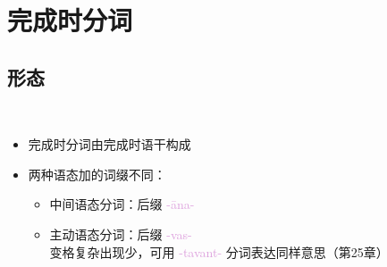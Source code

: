 \documentclass[17pt]{beamer}
\newcommand{\skt}[1]{{\sanskritfont{#1}}} %
\newcommand{\pratyaya}[1]{\mbox{\textcolor{Plum}{#1}}}
\begin{document}

\section[完成时\\分词]{完成时分词}
\begin{frame}{\insertsection}
  \small
  \tableofcontents[currentsection]
\end{frame}

\subsection{形态}
\begin{frame}{\insertsection ~~\insertsubsection}
  \begin{itemize}
    \item 完成时分词由完成时语干构成
    \item 两种语态加的词缀不同：
    \begin{itemize}
      \item 中间语态分词：后缀 \pratyaya{-āna-}
      \item 主动语态分词：后缀 \pratyaya{-vas-}
      \\变格复杂出现少，可用 \pratyaya{-tavant-} 分词表达同样意思（第25章）
    \end{itemize}
  \end{itemize}
\end{frame}
\end{document}
